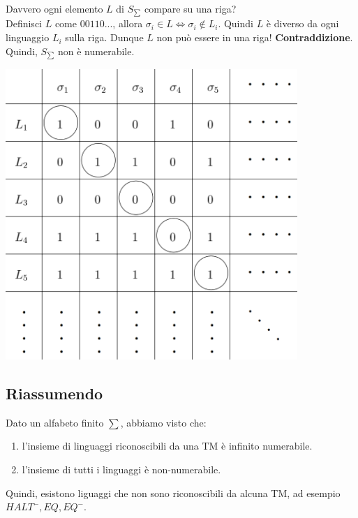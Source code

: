 \documentclass[a4paper, 12pt]{article}
\begin{document}
Davvero ogni elemento $L$ di $S_{\sum}$ compare su una riga?\\
Definisci $L$ come $00110...$, allora $\sigma_i \in L \iff \sigma_i \notin L_i$. Quindi $L$ \`e diverso da ogni linguaggio $L_i$ sulla riga. Dunque $L$ non pu\`o essere in una riga! \textbf{Contraddizione}.\\ Quindi, $S_{\sum}$ non \`e numerabile.\\ \begin{center}
 \includegraphics[scale=0.5]{tabella_linguaggi3.png}
\end{center}
\subsection{Riassumendo}
Dato un alfabeto finito $\sum$, abbiamo visto che:
\begin{enumerate}
\item l'insieme di linguaggi riconoscibili da una TM \`e infinito numerabile.
\item l'insieme di tutti i linguaggi \`e non-numerabile.
\end{enumerate}
Quindi, esistono liguaggi che non sono riconoscibili da alcuna TM, ad esempio $HALT^{-}, EQ, EQ^{-}$.\\
\end{document}

